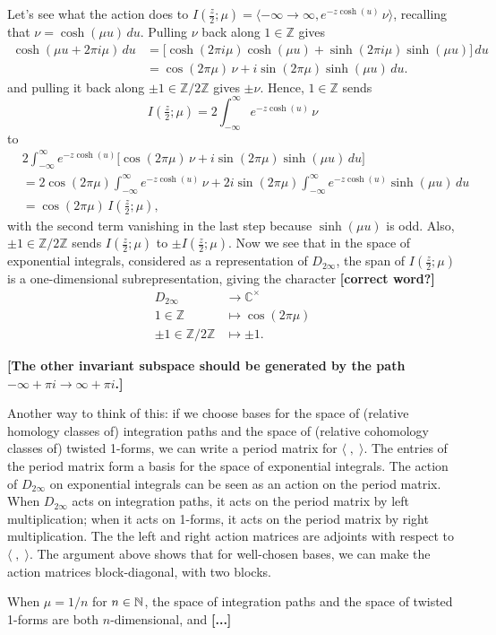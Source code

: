 \documentclass{article}
\newcommand{\Z}{\mathbb{Z}}
\newcommand{\C}{\mathbb{C}}
\begin{document}
Let's see what the action does to $I(\tfrac{z}{2}; \mu) = \langle -\infty \to \infty, e^{-z \cosh(u)}\,\nu \rangle$, recalling that $\nu = \cosh(\mu u)\,du$. Pulling $\nu$ back along $1 \in \Z$ gives
\begin{align*}
\cosh(\mu u + 2\pi i \mu)\,du & = \big[\cosh(2\pi i \mu) \cosh(\mu u) + \sinh(2\pi i \mu) \sinh(\mu u)\big]\,du \\
& = \cos(2\pi \mu)\,\nu + i\sin(2\pi \mu) \sinh(\mu u)\,du.
\end{align*}
and pulling it back along $\pm 1 \in \Z/2\Z$ gives $\pm\nu$. Hence, $1 \in \Z$ sends
\[ I(\tfrac{z}{2}; \mu) = 2\int_{-\infty}^{\infty} e^{-z\cosh(u)}\,\nu \]
to
\begin{align*}
& 2\int_{-\infty}^{\infty} e^{-z\cosh(u)} \big[\cos(2\pi \mu)\,\nu + i\sin(2\pi \mu) \sinh(\mu u)\,du\big] \\
& = 2\cos(2\pi \mu) \int_{-\infty}^{\infty} e^{-z\cosh(u)}\,\nu + 2i\sin(2\pi \mu) \int_{-\infty}^{\infty} e^{-z\cosh(u)} \sinh(\mu u)\,du \\
& = \cos(2\pi \mu)\,I(\tfrac{z}{2}; \mu),
\end{align*}
with the second term vanishing in the last step because $\sinh(\mu u)$ is odd. Also, $\pm 1 \in \Z/2\Z$ sends $I(\tfrac{z}{2}; \mu)$ to $\pm I(\tfrac{z}{2}; \mu)$. Now we see that in the space of exponential integrals, considered as a representation of $D_{2\infty}$, the span of $I(\tfrac{z}{2}; \mu)$ is a one-dimensional subrepresentation, giving the character \textbf{[correct word?]}
\begin{align*}
D_{2\infty} & \to \C^\times \\
1 \in \Z & \mapsto \cos(2\pi \mu) \\
\pm 1 \in \Z/2\Z & \mapsto \pm 1.
\end{align*}

\textbf{[The other invariant subspace should be generated by the path $-\infty + \pi i \to \infty + \pi i$.]}

Another way to think of this: if we choose bases for the space of (relative homology classes of) integration paths and the space of (relative cohomology classes of) twisted 1-forms, we can write a period matrix for $\langle\;,\;\rangle$. The entries of the period matrix form a basis for the space of exponential integrals. The action of $D_{2\infty}$ on exponential integrals can be seen as an action on the period matrix. When $D_{2\infty}$ acts on integration paths, it acts on the period matrix by left multiplication; when it acts on 1-forms, it acts on the period matrix by right multiplication. The the left and right action matrices are adjoints with respect to $\langle\;,\;\rangle$. The argument above shows that for well-chosen bases, we can make the action matrices block-diagonal, with two blocks.

When $\mu = 1/n$ for $n \in \mathbb N$, the space of integration paths and the space of twisted 1-forms are both $n$-dimensional, and \textbf{[...]}



\end{document}
